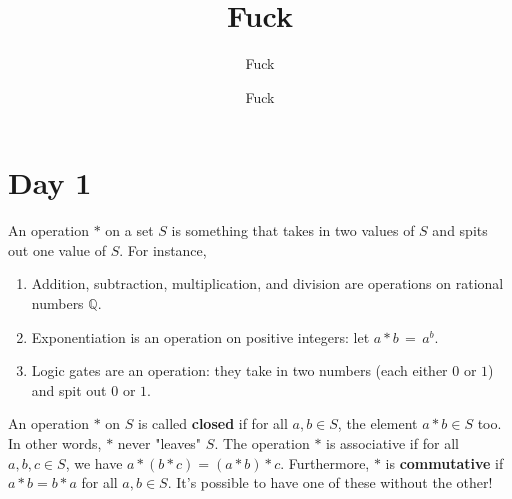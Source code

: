 \documentclass[11pt]{article}
\title{Fuck}
\author{Fuck}
\date{Fuck}
\begin{document}
\maketitle
\tableofcontents
\newpage


\section{Day 1}

An operation $\ast$ on a set $S$ is something that takes in two values of $S$ and spits out one value of $S$. For instance,
\begin{enumerate}
  \item Addition, subtraction, multiplication, and division are operations on rational numbers $\mathbb{Q}$.
  \item Exponentiation is an operation on positive integers: let $a \ast b \, = \, a^{b}$.
  \item Logic gates are an operation: they take in two numbers (each either $0$ or $1$) and spit out $0$ or $1$.
\end{enumerate}
An operation $\ast$ on $S$ is called \textbf{closed} if for all $a, b \in S$, the element $a \ast b \in S$ too. In other words, $\ast$ never "leaves" $S$. The operation $\ast$ is associative if for all $a, b, c \in S$, we have $a \ast (b \ast c) = (a \ast b) \ast c$. Furthermore, $\ast$ is \textbf{commutative} if $a \ast b = b \ast a$ for all $a, b \in S$. It's possible to have one of these without the other! 


\end{document}

